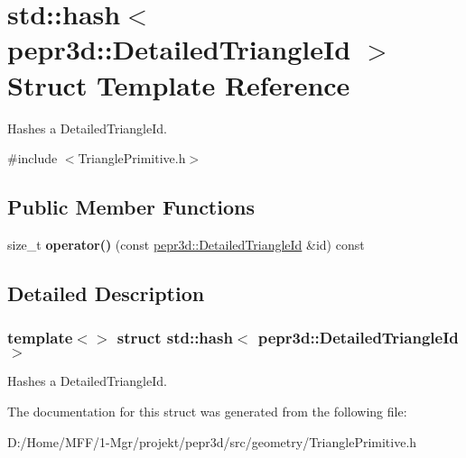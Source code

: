 \hypertarget{structstd_1_1hash_3_01pepr3d_1_1_detailed_triangle_id_01_4}{}\section{std\+::hash$<$ pepr3d\+::Detailed\+Triangle\+Id $>$ Struct Template Reference}
\label{structstd_1_1hash_3_01pepr3d_1_1_detailed_triangle_id_01_4}


Hashes a Detailed\+Triangle\+Id.  




{\ttfamily \#include $<$Triangle\+Primitive.\+h$>$}

\subsection*{Public Member Functions}
\begin{DoxyCompactItemize}
\item 
\mbox{\label{structstd_1_1hash_3_01pepr3d_1_1_detailed_triangle_id_01_4_a0c16ac520b8a68df45516c16eaf00aaa}} 
size\+\_\+t {\bfseries operator()} (const \mbox{\hyperlink{structpepr3d_1_1_detailed_triangle_id}{pepr3d\+::\+Detailed\+Triangle\+Id}} \&id) const
\end{DoxyCompactItemize}


\subsection{Detailed Description}
\subsubsection*{template$<$$>$\newline
struct std\+::hash$<$ pepr3d\+::\+Detailed\+Triangle\+Id $>$}

Hashes a Detailed\+Triangle\+Id. 

The documentation for this struct was generated from the following file\+:\begin{DoxyCompactItemize}
\item 
D\+:/\+Home/\+M\+F\+F/1-\/\+Mgr/projekt/pepr3d/src/geometry/Triangle\+Primitive.\+h\end{DoxyCompactItemize}
